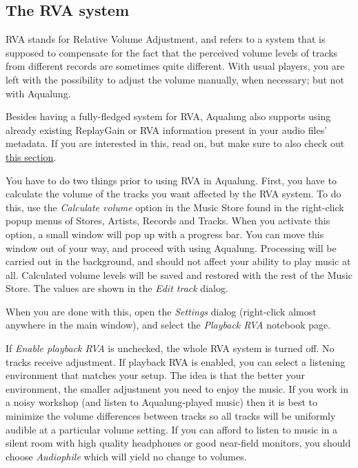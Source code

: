 \documentclass[10pt,english]{article}
\begin{document}
\subsection{The RVA system\label{idp645824}}



\noindent RVA stands for Relative Volume Adjustment, and refers to a
system that is supposed to compensate for the fact that the
perceived volume levels of tracks from different records are
sometimes quite different. With usual players, you are left
with the possibility to adjust the volume manually, when
necessary; but not with Aqualung.




Besides having a fully-fledged system for RVA, Aqualung
also supports using already existing ReplayGain or RVA
information present in your audio files' metadata. If you are
interested in this, read on, but make sure to also check out
\hyperref[idp727104]{\color{blue}this section}.




You have to do two things prior to using RVA in
Aqualung. First, you have to calculate the volume of the
tracks you want affected by the RVA system. To do this, use
the \textsl{Calculate volume} option in the Music Store
found in the right-click popup menus of Stores, Artists,
Records and Tracks. When you activate this option, a small
window will pop up with a progress bar. You can move this
window out of your way, and proceed with using
Aqualung. Processing will be carried out in the background,
and should not affect your ability to play music at
all. Calculated volume levels will be saved and restored with
the rest of the Music Store. The values are shown in the
\textsl{Edit track} dialog.




When you are done with this, open the \textsl{Settings}
dialog (right-click almost anywhere in the main window), and
select the \textsl{Playback RVA} notebook page.




If \textsl{Enable playback RVA} is unchecked, the whole
RVA system is turned off. No tracks receive adjustment. If
playback RVA is enabled, you can select a listening
environment that matches your setup. The idea is that the
better your environment, the smaller adjustment you need to
enjoy the music. If you work in a noisy workshop (and listen
to Aqualung-played music) then it is best to minimize the
volume differences between tracks so all tracks will be
uniformly audible at a particular volume setting. If you can
afford to listen to music in a silent room with high quality
headphones or good near-field monitors, you should choose
\textsl{Audiophile} which will yield no change to
volumes.
\end{document}
